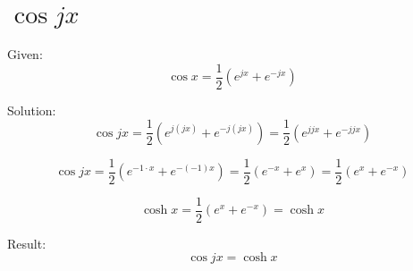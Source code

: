 \documentclass[a4paper, 10pt]{scrartcl}
\begin{document}
\section{$\cos{jx}$}

Given:
\[\cos{x} = \frac{1}{2}(e^{jx} + e^{-jx})\]

Solution:
\[\cos{jx} = \frac{1}{2}(e^{j(jx)} + e^{-j(jx)}) =
             \frac{1}{2}(e^{jjx} + e^{-jjx})\]

\[\cos{jx} = \frac{1}{2}(e^{-1\cdot x} + e^{-(-1)x}) =
             \frac{1}{2}(e^{-x} + e^{x}) = \frac{1}{2}(e^{x} + e^{-x})\]

\[\cosh{x} = \frac{1}{2}(e^{x} + e^{-x}) = \cosh{x}\]

Result:
\[\cos{jx} = \cosh{x}\]
\end{document}
